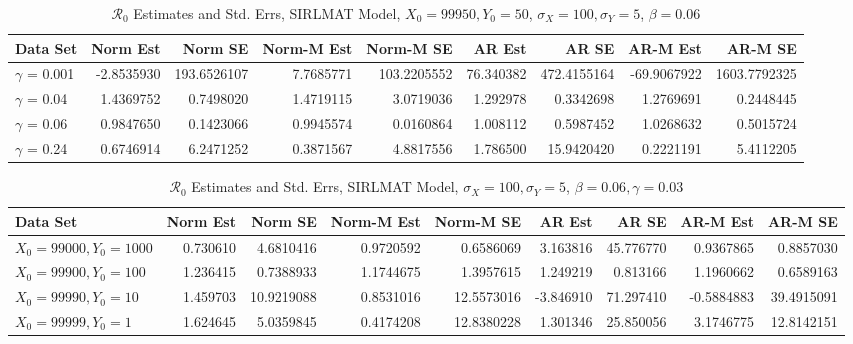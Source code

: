 \message{ !name(draft_v13.tex)}\documentclass[12pt]{article}
\newcommand{\rr}{\ensuremath{\mathcal{R}_0}}
\begin{document}
\begin{table}[H]
	
	\caption{\label{tab:}$\rr$ Estimates and Std. Errs, SIRLMAT Model,
		$X_0 = 99950, Y_0 = 50$, $\sigma_X = 100, \sigma_Y = 5$, $\beta = 0.06$}
	\centering
	\begin{footnotesize}
		\begin{tabular}[t]{l|r|r|r|r|r|r|r|r}
			\hline
			Data Set & Norm Est & Norm SE & Norm-M Est & Norm-M SE & AR Est & AR SE & AR-M Est & AR-M SE\\
			\hline
			$\gamma$ = 0.001 & -2.8535930 & 193.6526107 & 7.7685771 & 103.2205552 & 76.340382 & 472.4155164 & -69.9067922 & 1603.7792325\\
			\hline
			$\gamma$ = 0.04 & 1.4369752 & 0.7498020 & 1.4719115 & 3.0719036 & 1.292978 & 0.3342698 & 1.2769691 & 0.2448445\\
			\hline
			$\gamma$ = 0.06 & 0.9847650 & 0.1423066 & 0.9945574 & 0.0160864 & 1.008112 & 0.5987452 & 1.0268632 & 0.5015724\\
			\hline
			$\gamma$ = 0.24 & 0.6746914 & 6.2471252 & 0.3871567 & 4.8817556 & 1.786500 & 15.9420420 & 0.2221191 & 5.4112205\\
			\hline
		\end{tabular}
	\end{footnotesize}
\end{table}

\begin{table}[H]
	
	\caption{\label{tab:}$\rr$ Estimates and Std. Errs, SIRLMAT Model,
		$\sigma_X = 100, \sigma_Y = 5$, $\beta = 0.06, \gamma = 0.03$}
	\centering
	\begin{footnotesize}
		\begin{tabular}[t]{l|r|r|r|r|r|r|r|r}
			\hline
			Data Set & Norm Est & Norm SE & Norm-M Est & Norm-M SE & AR Est & AR SE & AR-M Est & AR-M SE\\
			\hline
			$X_0 = 99000, Y_0 = 1000$ & 0.730610 & 4.6810416 & 0.9720592 & 0.6586069 & 3.163816 & 45.776770 & 0.9367865 & 0.8857030\\
			\hline
			$X_0 = 99900, Y_0 = 100$ & 1.236415 & 0.7388933 & 1.1744675 & 1.3957615 & 1.249219 & 0.813166 & 1.1960662 & 0.6589163\\
			\hline
			$X_0 = 99990, Y_0 = 10$ & 1.459703 & 10.9219088 & 0.8531016 & 12.5573016 & -3.846910 & 71.297410 & -0.5884883 & 39.4915091\\
			\hline
			$X_0 = 99999, Y_0 = 1$ & 1.624645 & 5.0359845 & 0.4174208 & 12.8380228 & 1.301346 & 25.850056 & 3.1746775 & 12.8142151\\
			\hline
		\end{tabular}
	\end{footnotesize}
\end{table}
\end{document}
